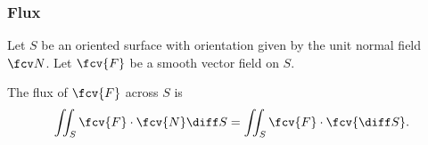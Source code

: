 

\begin{frame}
\frametitle{Flux}

Let $S$ be an oriented surface with orientation given by the unit normal field $\fcv N$. Let $\fcv{F}$ be a smooth vector field on $S$.
\begin{definition}
The flux of $\fcv{F}$ across $S$ is
\[
\iint_S \fcv{F}\cdot \fcv{N} \diff S = \iint_S \fcv{F} \cdot \fcv{\diff S} .
\]
\end{definition}

\end{frame}
